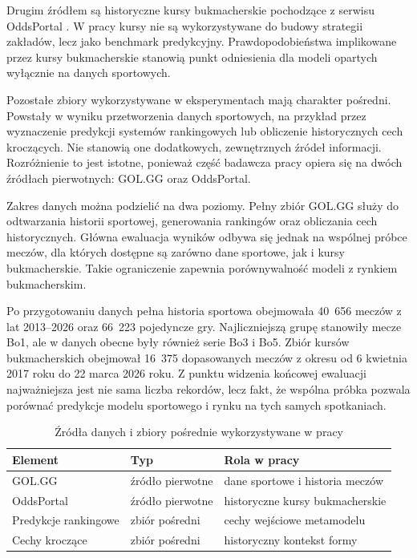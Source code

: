 Drugim źródłem są historyczne kursy bukmacherskie pochodzące z serwisu OddsPortal
\parencite{oddsportal}. W pracy kursy nie są wykorzystywane do budowy strategii zakładów, lecz jako
benchmark predykcyjny. Prawdopodobieństwa implikowane przez kursy bukmacherskie stanowią punkt
odniesienia dla modeli opartych wyłącznie na danych sportowych.

Pozostałe zbiory wykorzystywane w eksperymentach mają charakter pośredni. Powstały w wyniku
przetworzenia danych sportowych, na przykład przez wyznaczenie predykcji systemów rankingowych lub
obliczenie historycznych cech kroczących. Nie stanowią one dodatkowych, zewnętrznych źródeł
informacji. Rozróżnienie to jest istotne, ponieważ część badawcza pracy opiera się na dwóch źródłach
pierwotnych: GOL.GG oraz OddsPortal.

Zakres danych można podzielić na dwa poziomy. Pełny zbiór GOL.GG służy do odtwarzania historii
sportowej, generowania rankingów oraz obliczania cech historycznych. Główna ewaluacja wyników odbywa
się jednak na wspólnej próbce meczów, dla których dostępne są zarówno dane sportowe, jak i kursy
bukmacherskie. Takie ograniczenie zapewnia porównywalność modeli z rynkiem bukmacherskim.

Po przygotowaniu danych pełna historia sportowa obejmowała 40~656 meczów z lat 2013--2026 oraz
66~223 pojedyncze gry. Najliczniejszą grupę stanowiły mecze Bo1, ale w danych obecne były również
serie Bo3 i Bo5. Zbiór kursów bukmacherskich obejmował 16~375 dopasowanych meczów z okresu od 6
kwietnia 2017 roku do 22 marca 2026 roku. Z punktu widzenia końcowej ewaluacji najważniejsza jest
nie sama liczba rekordów, lecz fakt, że wspólna próbka pozwala porównać predykcje modelu sportowego
i rynku na tych samych spotkaniach.

\begin{table}[H]
    \centering
    \caption{Źródła danych i zbiory pośrednie wykorzystywane w pracy}
    \label{tab:data_sources_role}
    \begin{tabular}{lll}
        \toprule
        Element & Typ & Rola w pracy \\
        \midrule
        GOL.GG & źródło pierwotne & dane sportowe i historia meczów \\
        OddsPortal & źródło pierwotne & historyczne kursy bukmacherskie \\
        Predykcje rankingowe & zbiór pośredni & cechy wejściowe metamodelu \\
        Cechy kroczące & zbiór pośredni & historyczny kontekst formy \\
        \bottomrule
    \end{tabular}
\end{table}

